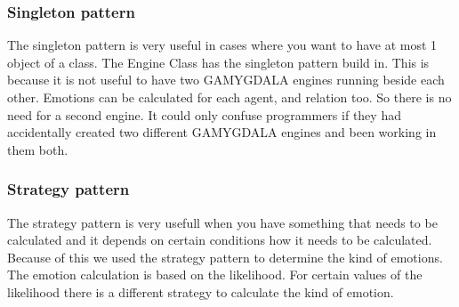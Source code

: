 \subsubsection{Singleton pattern}
The singleton pattern is very useful in cases where you want to have at most 1 object of a class. The Engine Class has the singleton pattern build in. This is because it is not useful to have two GAMYGDALA engines running beside each other. Emotions can be calculated for each agent, and relation too. So there is no need for a second engine. It could only confuse programmers if they had accidentally created two different GAMYGDALA engines and been working in them both.  
  
\subsubsection{Strategy pattern}
The strategy pattern is very usefull when you have something that needs to be calculated and it depends on certain conditions how it needs to be calculated. Because of this we used the strategy pattern to determine the kind of emotions. The emotion calculation is based on the likelihood. For certain values of the likelihood there is a different strategy to calculate the kind of emotion.